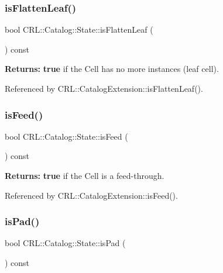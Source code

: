 \subsubsection{\texorpdfstring{is\+Flatten\+Leaf()}{isFlattenLeaf()}}
{\footnotesize\ttfamily bool C\+R\+L\+::\+Catalog\+::\+State\+::is\+Flatten\+Leaf (\begin{DoxyParamCaption}{ }\end{DoxyParamCaption}) const\hspace{0.3cm}{\ttfamily [inline]}}

{\bfseries Returns\+:} {\bfseries true} if the Cell has no more instances (leaf cell). 

Referenced by C\+R\+L\+::\+Catalog\+Extension\+::is\+Flatten\+Leaf().

\mbox{\label{classCRL_1_1Catalog_1_1State_a53c89121d49a7fc9f8a09093a35d32c4}} 
\subsubsection{\texorpdfstring{is\+Feed()}{isFeed()}}
{\footnotesize\ttfamily bool C\+R\+L\+::\+Catalog\+::\+State\+::is\+Feed (\begin{DoxyParamCaption}{ }\end{DoxyParamCaption}) const\hspace{0.3cm}{\ttfamily [inline]}}

{\bfseries Returns\+:} {\bfseries true} if the Cell is a feed-\/through. 

Referenced by C\+R\+L\+::\+Catalog\+Extension\+::is\+Feed().

\mbox{\label{classCRL_1_1Catalog_1_1State_a457e8dcf1928e6df40ec9f686350c2d0}} 
\subsubsection{\texorpdfstring{is\+Pad()}{isPad()}}
{\footnotesize\ttfamily bool C\+R\+L\+::\+Catalog\+::\+State\+::is\+Pad (\begin{DoxyParamCaption}{ }\end{DoxyParamCaption}) const\hspace{0.3cm}{\ttfamily [inline]}}

